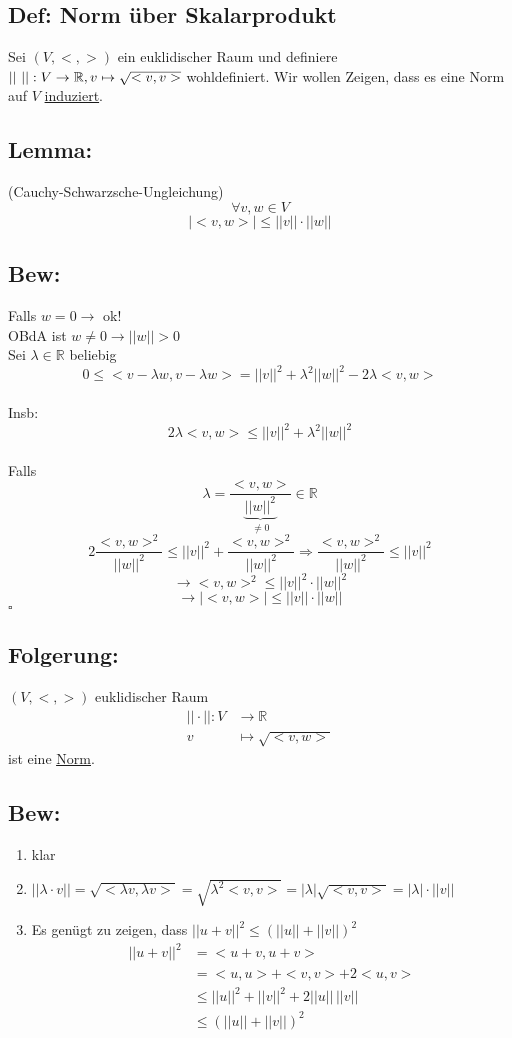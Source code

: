 \documentclass[titlepage,12pt,a4paper,ngerman]{report}
\newenvironment{bew}[1]{\subsection{Bew: #1}}{\hfill$\square$}
\newcommand{\Bew}[2]{\begin{bew}{#1}#2\end{bew}}
\newcommand{\ub}[1]{\underbrace{#1}}
\begin{document}

\subsection{Def: Norm über Skalarprodukt}
Sei $(V,<,>)$ ein euklidischer Raum und definiere $||\ ||: V \to \mathbb R,\\v \mapsto \sqrt{<v,v>}$ wohldefiniert. Wir wollen Zeigen, dass es eine Norm auf $V$ \underline{induziert}.
\subsection{Lemma:}
(Cauchy-Schwarzsche-Ungleichung)
$$\forall v, w \in V$$
$$|<v,w>| \leq ||v|| \cdot ||w||$$
\Bew{}{
	Falls $w=0 \rightarrow$ ok!\\
	OBdA ist $ w \neq 0 \rightarrow ||w||>0 $\\
	Sei $  \lambda \in \mathbb{R} $ beliebig \\
	$$ 0 \le < v- \lambda w , v - \lambda w > = ||v||^2+ \lambda^2 ||w||^2 - 2 \lambda <v,w> $$\\
	Insb:
	$$ 2 \lambda <v,w> \le ||v||^2 + \lambda^2 ||w||^2 $$\\
	Falls $$ \lambda = \frac{<v,w>}{\ub{||w||^2}_{\neq 0}} \in \mathbb{R} $$
	$$ 2 \frac{<v,w>^2}{||w||^2} \le ||v||^2 + \frac{<v,w>^2}{||w||^2} \Rightarrow \frac{<v,w>^2}{||w||^2} \le ||v||^2 $$
	$$ \rightarrow <v,w>^2 \le ||v||^2 \cdot ||w||^2$$
	$$ \rightarrow |<v,w>| \le ||v|| \cdot ||w|| $$
}
\subsection*{Folgerung:}
$ (V,<,>) $ euklidischer Raum\\
\begin{align*}
||\cdot ||: V & \to \mathbb{R}\\
v & \mapsto \sqrt{<v,w>}
\end{align*}
ist eine \underline{\underline{Norm}}.
\subsection{Bew:}
\begin{enumerate}[1)]
	\item klar
	\item $ ||\lambda \cdot v || = \sqrt{< \lambda v,  \lambda v>} = \sqrt{\lambda^2 <v,v>} = |\lambda| \sqrt{<v,v>} = |\lambda| \cdot ||v|| $
	\item Es genügt zu zeigen, dass $ ||u+v||^2 \le (||u|| + ||v||)^2 $\\
	\begin{align*}
	||u+v||^2 & = < u+v, u+v>\\
	& = < u,u> + <v,v> + 2 <u,v>\\
	& \le ||u||^2 + ||v||^2 + 2 ||u||\, ||v||\\
	& \le (||u|| + ||v||)^2
	\end{align*}
\end{enumerate}
\end{document}
